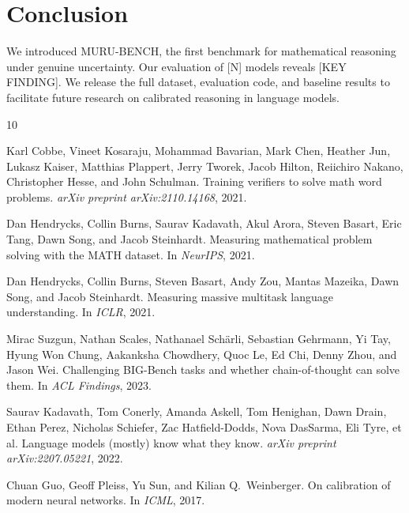 \documentclass{article}
\begin{document}
\section{Conclusion}
\label{sec:conclusion}

We introduced MURU-BENCH, the first benchmark for mathematical reasoning under genuine uncertainty. Our evaluation of [N] models reveals [KEY FINDING]. We release the full dataset, evaluation code, and baseline results to facilitate future research on calibrated reasoning in language models.




\begin{thebibliography}{10}

Karl Cobbe, Vineet Kosaraju, Mohammad Bavarian, Mark Chen, Heather Jun, Lukasz Kaiser, Matthias Plappert, Jerry Tworek, Jacob Hilton, Reiichiro Nakano, Christopher Hesse, and John Schulman.
\newblock Training verifiers to solve math word problems.
\newblock \emph{arXiv preprint arXiv:2110.14168}, 2021.

Dan Hendrycks, Collin Burns, Saurav Kadavath, Akul Arora, Steven Basart, Eric Tang, Dawn Song, and Jacob Steinhardt.
\newblock Measuring mathematical problem solving with the MATH dataset.
\newblock In \emph{NeurIPS}, 2021.

Dan Hendrycks, Collin Burns, Steven Basart, Andy Zou, Mantas Mazeika, Dawn Song, and Jacob Steinhardt.
\newblock Measuring massive multitask language understanding.
\newblock In \emph{ICLR}, 2021.

Mirac Suzgun, Nathan Scales, Nathanael Sch{\"a}rli, Sebastian Gehrmann, Yi Tay, Hyung Won Chung, Aakanksha Chowdhery, Quoc Le, Ed Chi, Denny Zhou, and Jason Wei.
\newblock Challenging BIG-Bench tasks and whether chain-of-thought can solve them.
\newblock In \emph{ACL Findings}, 2023.

Saurav Kadavath, Tom Conerly, Amanda Askell, Tom Henighan, Dawn Drain, Ethan Perez, Nicholas Schiefer, Zac Hatfield-Dodds, Nova DasSarma, Eli Tyre, et al.
\newblock Language models (mostly) know what they know.
\newblock \emph{arXiv preprint arXiv:2207.05221}, 2022.

Chuan Guo, Geoff Pleiss, Yu Sun, and Kilian Q.\ Weinberger.
\newblock On calibration of modern neural networks.
\newblock In \emph{ICML}, 2017.


\end{thebibliography}
\end{document}
